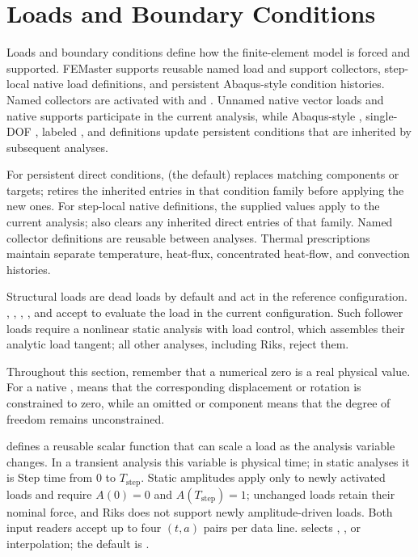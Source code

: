 \section{Loads and Boundary Conditions}
\label{sec:loads-bcs}

Loads and boundary conditions define how the finite-element model is forced and supported. FEMaster supports reusable named load and support collectors, step-local native load definitions, and persistent Abaqus-style condition histories. Named collectors are activated with  and . Unnamed native vector loads and native supports participate in the current analysis, while Abaqus-style , single-DOF , labeled , and  definitions update persistent conditions that are inherited by subsequent analyses.

For persistent direct conditions,  (the default)
replaces matching components or targets;  retires the
inherited entries in that condition family before applying the new
ones. For step-local native definitions, the supplied values apply
to the current analysis;  also clears any inherited direct
entries of that family. Named collector definitions are reusable
between analyses. Thermal prescriptions maintain separate temperature,
heat-flux, concentrated heat-flow, and convection histories.

Structural loads are dead loads by default and act in the reference
configuration. , , , , and
 accept  to evaluate the load in the
current configuration. Such follower loads require a nonlinear static
analysis with load control, which assembles their analytic load
tangent; all other analyses, including Riks, reject them.

Throughout this section, remember that a numerical zero is a real physical value. For a native ,  means that the corresponding displacement or rotation is constrained to zero, while an omitted or  component means that the degree of freedom remains unconstrained.


 defines a reusable scalar function that can scale a load as the analysis variable changes. In a transient analysis this variable is physical time; in static analyses it is Step time from \(0\) to \(T_{\mathrm{step}}\). Static amplitudes apply only to newly activated loads and require \(A(0)=0\) and \(A(T_{\mathrm{step}})=1\); unchanged loads retain their nominal force, and Riks does not support newly amplitude-driven loads. Both input readers accept up to four \((t,a)\) pairs per data line.  selects , , or  interpolation; the default is .

